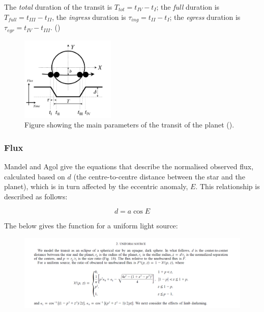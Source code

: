 \documentclass[11pt]{article}
\begin{document}
The \emph{total} duration of the transit is
\(T_{tot} = t_{IV} - t_{I}\); the \emph{full} duration is
\(T_{full} = t_{III} - t_{II}\), the \emph{ingress} duration is
\(\tau_{ing} = t_{II} - t_{I}\); the \emph{egress} duration is
\(\tau_{egr} = t_{IV} - t_{III}\). (\cite{Winn})


\begin{figure}[!ht]
	\centering
	\includegraphics[width=0.4\textwidth]{../images/transit_flux.png}
	\caption{Figure showing the main parameters of the transit of the planet (\cite{Winn}).} \label{Figure 2.d}
\end{figure}



    \hypertarget{flux}{%
\subsubsection{Flux}\label{flux}}

Mandel and Agol \parencite*{Mandel} give the equations that describe the normalised observed flux, calculated based on \(d\) (the centre-to-centre distance between the star and the planet), which is in turn affected by the eccentric anomaly, \(E\). This relationship is described as follows:

\begin{equation*}
d = a\cos{E}
\end{equation*}

The below gives the function for a uniform light source:

\begin{figure}[H]
	\centering
	\includegraphics[width=\textwidth]{../images/uniform_source.png}
	\label{Figure 2.e}
\end{figure}
\end{document}

